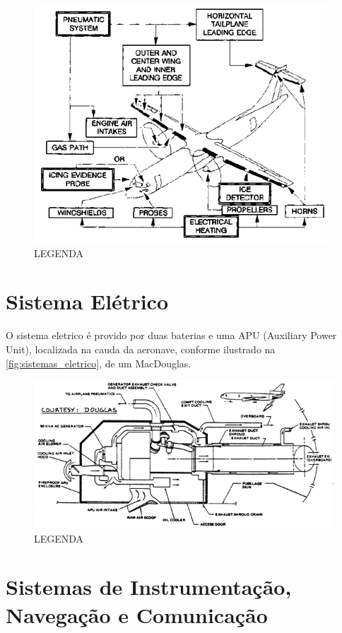 \begin{figure}
\centering
\includegraphics{images/parte3/sistemas_antigelo_degelo.png}
\caption{LEGENDA}
\label{fig:sistemas_antigelo_degelo}
\end{figure}


\section{Sistema Elétrico}

O sistema eletrico é provido por duas baterias e uma APU (Auxiliary Power Unit), localizada na cauda da aeronave, conforme ilustrado na \autoref{fig:sistemas_eletrico}, de um MacDouglas.

\begin{figure}
\centering
\includegraphics{images/parte3/sistemas_eletrico.png}
\caption{LEGENDA}
\label{fig:sistemas_eletrico}
\end{figure}

\section{Sistemas de Instrumentação, Navegação e Comunicação}


